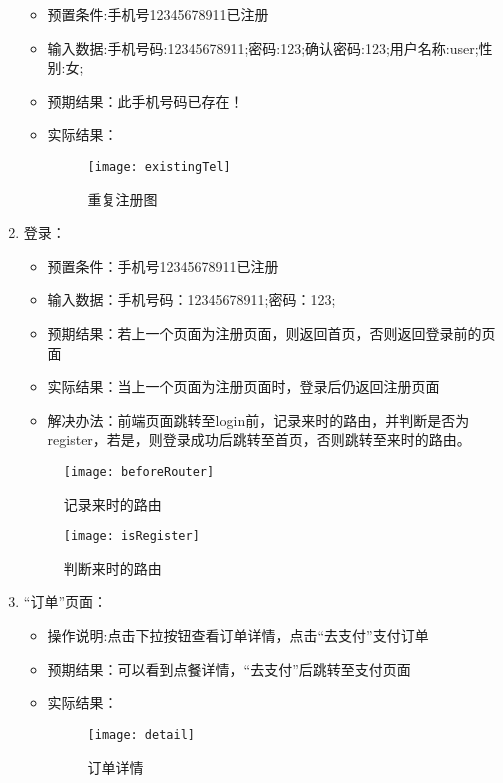\begin{enumerate}
\begin{itemize}
\item{预置条件}:手机号12345678911已注册
\item{输入数据}:手机号码:12345678911;密码:123;确认密码:123;用户名称:user;性别:女;
\item {预期结果}：此手机号码已存在！
\item {实际结果}：
\begin{figure}[htbp]
\centering
\texttt{[image: existingTel]}
\caption{重复注册图}\label{fig:existingTel}
\end{figure}
\end{itemize}
\item {登录}：
\begin{itemize}
\item{预置条件}：手机号12345678911已注册
\item{输入数据}：手机号码：12345678911;密码：123;
\item{预期结果}：若上一个页面为注册页面，则返回首页，否则返回登录前的页面
\item{实际结果}：当上一个页面为注册页面时，登录后仍返回注册页面
\item{解决办法}：前端页面跳转至login前，记录来时的路由，并判断是否为register，若是，则登录成功后跳转至首页，否则跳转至来时的路由。
\end{itemize}
\begin{figure}[htbp]
\centering
\texttt{[image: beforeRouter]}
\caption{记录来时的路由}\label{fig:beforeRouter}
\end{figure}
\begin{figure}[htbp]
\centering
\texttt{[image: isRegister]}
\caption{判断来时的路由}\label{fig:isRegister}
\end{figure}
\item {“订单”页面}：
\begin{itemize}
\item{操作说明}:点击下拉按钮查看订单详情，点击“去支付”支付订单
\item {预期结果}：可以看到点餐详情，“去支付”后跳转至支付页面
\item {实际结果}：
\begin{figure}[htbp]
\centering
\texttt{[image: detail]}
\caption{订单详情}\label{fig:detail}
\end{figure}
\end{itemize}


\end{enumerate}
